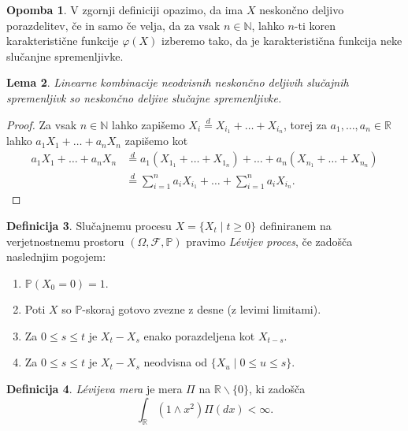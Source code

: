 \documentclass[12pt,a4paper]{amsart}
\theoremstyle{definition} %
\newtheorem{definicija}{Definicija}[section]
\newtheorem{opomba}[definicija]{Opomba}
\theoremstyle{plain} %
\newtheorem{lema}[definicija]{Lema}
\begin{document}
    \begin{opomba}
        V zgornji definiciji opazimo, da ima $X$ neskončno deljivo porazdelitev, če in samo če velja, da za 
        vsak $n \in \mathbb{N}$, lahko $n$-ti koren karakteristične funkcije $\varphi(X)$ izberemo tako, da 
        je karakteristična funkcija neke slučanjne spremenljivke.
    \end{opomba}

    \begin{lema}
        Linearne kombinacije neodvisnih neskončno deljivih slučajnih spremenljivk so neskončno deljive slučajne spremenljivke.
    \end{lema}


    \begin{proof}
        Za vsak $n \in \mathbb{N}$ lahko zapišemo $X_i \stackrel{d}{=} X_{i_1} + \dots + X_{i_n}$, torej za
        $a_1, \dots, a_n \in \mathbb{R}$ lahko $a_1X_1 + \dots + a_nX_n$ zapišemo kot 
        \begin{align*}
            a_1X_1 + \dots + a_nX_n &\stackrel{d}{=} a_1(X_{1_1} + \dots + X_{1_n}) + \dots + a_n(X_{n_1} + \dots + X_{n_n}) \\
                                    &\stackrel{d}{=} \sum_{i=1}^na_iX_{i_1} + \dots + \sum_{i=1}^na_iX_{i_n}.
        \end{align*}
    \end{proof}

    \begin{definicija}
        Slučajnemu procesu $X = \{X_t \mid t \geq 0\}$ definiranem na verjetnostnemu
        prostoru $(\Omega, \mathcal{F}, \mathds{P})$ pravimo \textit{Lévijev proces}, če zadošča naslednjim pogojem:
        \begin{enumerate}
            \item $\mathds{P}(X_0 = 0)=1$.
            \item Poti $X$ so $\mathds{P}$-skoraj gotovo zvezne z desne (z levimi limitami).
            \item Za $0 \leq s \leq t$ je $X_t - X_s$ enako porazdeljena kot $X_{t-s}$.
            \item Za $0 \leq s \leq t$ je $X_t - X_s$ neodvisna od $\{X_u \mid 0 \leq u \leq s\}$.
        \end{enumerate}
    \end{definicija}

    \begin{definicija}
        \textit{Lévijeva mera} je mera $\Pi$ na $\mathbb{R}\backslash\{0\}$, ki zadošča
        $$
        \int_{\mathbb{R}}(1 \wedge x^2)\Pi(dx) < \infty.
        $$
    \end{definicija}
\end{document}
